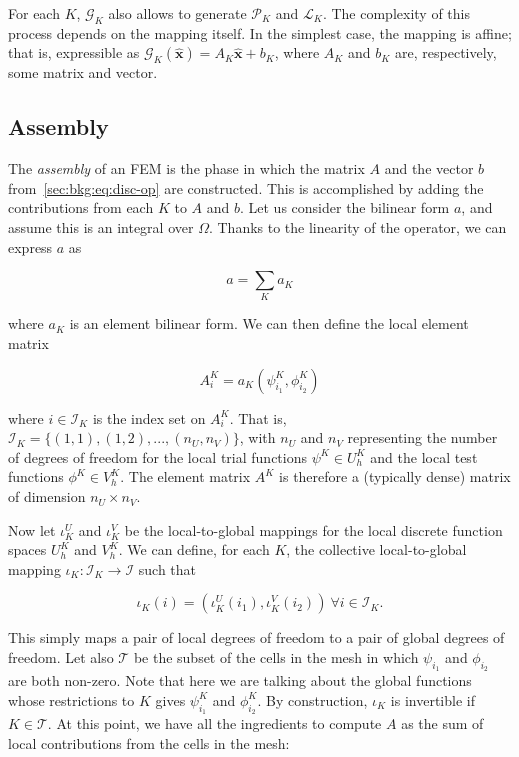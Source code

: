 For each $K$, $\mathcal{G}_K$ also allows to generate $\mathcal{P}_K$ and $\mathcal{L}_K$.  The complexity of this process depends on the mapping itself. In the simplest case, the mapping is affine; that is, expressible as $\mathcal{G}_K(\hat{\boldsymbol{x}}) = A_K \hat{\boldsymbol{x}} + b_K$, where $A_K$ and $b_K$ are, respectively, some matrix and vector.


\subsection{Assembly}
\label{sec:bkg:assembly}
The {\em assembly} of an FEM is the phase in which the matrix $A$ and the vector $b$ from~\ref{sec:bkg:eq:disc-op} are constructed. This is accomplished by adding the contributions from each $K$ to $A$ and $b$. Let us consider the bilinear form $a$, and assume this is an integral over $\Omega$. Thanks to the linearity of the operator, we can express $a$ as

\begin{equation}
a = \sum_{K} a_K
\end{equation}

where $a_K$ is an element bilinear form. We can then define the local element matrix

\begin{equation}
A_i^K = a_K (\psi_{i_1}^K, \phi_{i_2}^K)
\end{equation}

where $i \in \mathcal{I}_K$ is the index set on $A_i^K$. That is, $\mathcal{I}_K = \lbrace (1,1), (1,2), ..., (n_U, n_V) \rbrace$, with $n_U$ and $n_V$ representing the number of degrees of freedom for the local trial functions $\psi^K \in U_h^K$ and the local test functions $\phi^K \in V_h^K$. The element matrix $A^K$ is therefore a (typically dense) matrix of dimension $n_U \times n_V$.

Now let $\iota_K^U$ and $\iota_K^V$ be the local-to-global mappings for the local discrete function spaces $U_h^K$ and $V_h^K$. We can define, for each $K$, the collective local-to-global mapping $\iota_K : \mathcal{I}_K \rightarrow \mathcal{I}$ such that

\begin{equation}
\iota_K (i) = (\iota_K^U(i_1), \iota_K^V(i_2))\ \forall i \in \mathcal{I}_K.
\end{equation}

This simply maps a pair of local degrees of freedom to a pair of global degrees of freedom. Let also $\mathcal{T}$ be the subset of the cells in the mesh in which $\psi_{i_1}$ and $\phi_{i_2}$ are both non-zero. Note that here we are talking about the global functions whose restrictions to $K$ gives $\psi_{i_1}^K$ and $\phi_{i_2}^K$. By construction, $\iota_K$ is invertible if $K \in \mathcal{T}$. At this point, we have all the ingredients to compute $A$ as the sum of local contributions from the cells in the mesh:

